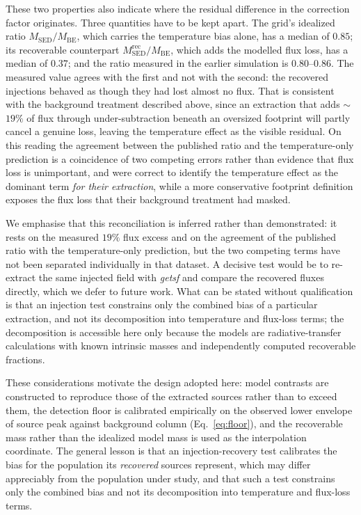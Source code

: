 \documentclass[11pt,a4paper]{article}
\begin{document}
These two properties also indicate where the residual difference in the
correction factor originates. Three quantities have to be kept apart. The
grid's idealized ratio $M_{\mathrm{SED}}/M_{\mathrm{BE}}$, which carries the
temperature bias alone, has a median of $0.85$; its recoverable counterpart
$M_{\mathrm{SED}}^{\mathrm{rec}}/M_{\mathrm{BE}}$, which adds the modelled
flux loss, has a median of $0.37$; and the ratio measured in the earlier
simulation is $0.80$--$0.86$. The measured value agrees with the first and
not with the second: the recovered injections behaved as though they had lost
almost no flux. That is consistent with the background treatment described
above, since an extraction that adds $\sim$$19\%$ of flux through
under-subtraction beneath an oversized footprint will partly cancel a genuine
loss, leaving the temperature effect as the visible residual. On this reading
the agreement between the published ratio and the temperature-only prediction
is a coincidence of two competing errors rather than evidence that flux loss
is unimportant, and \citet{Konyves+2015} were correct to identify the
temperature effect as the dominant term \emph{for their extraction}, while a
more conservative footprint definition exposes the flux loss that their
background treatment had masked.

We emphasise that this reconciliation is inferred rather than demonstrated:
it rests on the measured $19\%$ flux excess and on the agreement of the
published ratio with the temperature-only prediction, but the two competing
terms have not been separated individually in that dataset. A decisive test
would be to re-extract the same injected field with \emph{getsf} and compare
the recovered fluxes directly, which we defer to future work. What can be
stated without qualification is that an injection test constrains only the
combined bias of a particular extraction, and not its decomposition into
temperature and flux-loss terms; the decomposition is accessible here only
because the models are radiative-transfer calculations with known intrinsic
masses and independently computed recoverable fractions.

These considerations motivate the design adopted here: model contrasts are
constructed to reproduce those of the extracted sources rather than to exceed
them, the detection floor is calibrated empirically on the observed lower
envelope of source peak against background column (Eq.~\ref{eq:floor}), and
the recoverable mass rather than the idealized model mass is used as the
interpolation coordinate. The general lesson is that an injection-recovery
test calibrates the bias for the population its \emph{recovered} sources
represent, which may differ appreciably from the population under study, and
that such a test constrains only the combined bias and not its decomposition
into temperature and flux-loss terms.
\end{document}
